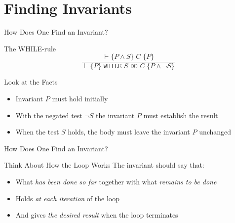 \section{Finding Invariants}

\begin{frame}{How Does One Find an Invariant?}
    \begin{block}{The WHILE-rule}
        \[ \frac{\vdash \{P \wedge S\} \; C \; \{P\}}{\vdash \{P\} \; \texttt{WHILE } S \texttt{ DO } C \; \{P \wedge \neg S\}} \]
    \end{block}

    \begin{block}{Look at the Facts}
        \begin{itemize}
            \item Invariant $P$ must hold initially
            \item With the negated test $\neg S$ the invariant $P$ must establish the result
            \item When the test $S$ holds, the body must leave the invariant $P$ unchanged
        \end{itemize}
    \end{block}

\end{frame}
\begin{frame}{How Does One Find an Invariant?}
    \begin{block}{Think About How the Loop Works}
        The invariant should say that:
        \begin{itemize}
            \item What \emph{has been done so far} together with what \emph{remains to be done}
            \item Holds \emph{at each iteration} of the loop
            \item And gives \emph{the desired result} when the loop terminates
        \end{itemize}
    \end{block}
\end{frame}

